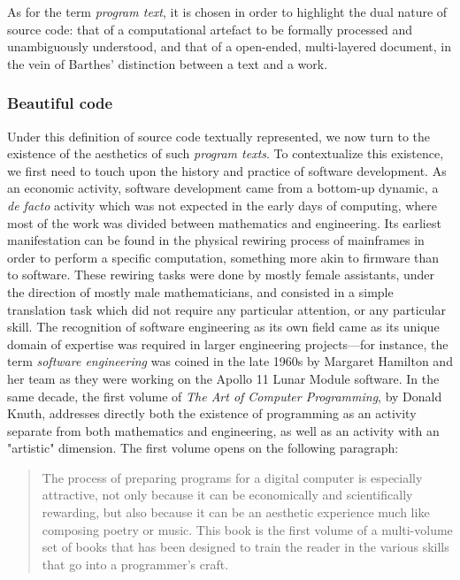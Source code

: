 As for the term \emph{program text}, it is chosen in order to highlight the dual nature of source code: that of a computational artefact to be formally processed and unambiguously understood\cite{detienne_software_2012}, and that of a open-ended, multi-layered document, in the vein of Barthes' distinction between a text and a work\cite{barthes_bruissement_1984}.

\subsubsection{Beautiful code}

Under this definition of source code textually represented, we now turn to the existence of the aesthetics of such \emph{program texts}. To contextualize this existence, we first need to touch upon the history and practice of software development. As an economic activity, software development came from a bottom-up dynamic, a \emph{de facto} activity which was not expected in the early days of computing, where most of the work was divided between mathematics and engineering. Its earliest manifestation can be found in the physical rewiring process of mainframes in order to perform a specific computation, something more akin to firmware than to software. These rewiring tasks were done by mostly female assistants, under the direction of mostly male mathematicians\cite{chun_software_2005}, and consisted in a simple translation task which did not require any particular attention, or any particular skill. The recognition of software engineering as its own field came as its unique domain of expertise was required in larger engineering projects—for instance, the term \emph{software engineering} was coined in the late 1960s by Margaret Hamilton and her team as they were working on the Apollo 11 Lunar Module software\cite{mindell_digital_2011}. In the same decade, the first volume of \emph{The Art of Computer Programming}, by Donald Knuth, addresses directly both the existence of programming as an activity separate from both mathematics and engineering, as well as an activity with an "artistic" dimension\cite{knuth_art_1997}. The first volume opens on the following paragraph:

\begin{quote}
    The process of preparing programs for a digital computer is especially attractive, not only because it can be economically and scientifically rewarding, but also because it can be an aesthetic experience much like composing poetry or music. This book is the first volume of a multi-volume set of books that has been designed to train the reader in the various skills that go into a programmer's craft.\cite{knuth_art_1997}
\end{quote}

